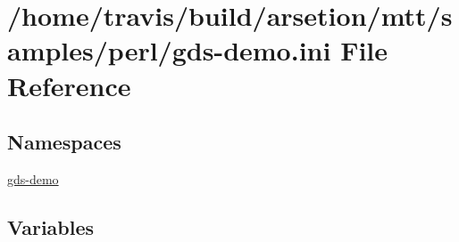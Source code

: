 \hypertarget{gds-demo_8ini}{\section{/home/travis/build/arsetion/mtt/samples/perl/gds-\/demo.ini File Reference}
\label{gds-demo_8ini}
}
\subsection*{Namespaces}
\begin{DoxyCompactItemize}
\item 
\hyperlink{namespacegds-demo}{gds-\/demo}
\end{DoxyCompactItemize}
\subsection*{Variables}
